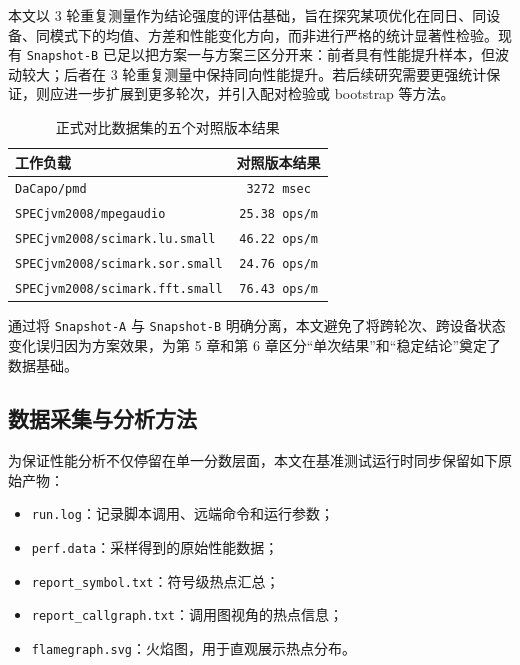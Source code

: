 本文以 3 轮重复测量作为结论强度的评估基础，旨在探究某项优化在同日、同设备、同模式下的均值、方差和性能变化方向，而非进行严格的统计显著性检验。现有 \texttt{Snapshot-B} 已足以把方案一与方案三区分开来：前者具有性能提升样本，但波动较大；后者在 3 轮重复测量中保持同向性能提升。若后续研究需要更强统计保证，则应进一步扩展到更多轮次，并引入配对检验或 bootstrap 等方法。

\begin{table}[htbp]
    \centering
    \small
    \caption{正式对比数据集的五个对照版本结果}
    \label{tab:formal-baseline-values}
    \begin{tabular}{lc}
        \hline
        \textbf{工作负载} & \textbf{对照版本结果} \\
        \hline
        \texttt{DaCapo/pmd} & \texttt{3272\,msec} \\
        \texttt{SPECjvm2008/mpegaudio} & \texttt{25.38\,ops/m} \\
        \texttt{SPECjvm2008/scimark.lu.small} & \texttt{46.22\,ops/m} \\
        \texttt{SPECjvm2008/scimark.sor.small} & \texttt{24.76\,ops/m} \\
        \texttt{SPECjvm2008/scimark.fft.small} & \texttt{76.43\,ops/m} \\
        \hline
    \end{tabular}
\end{table}

通过将 \texttt{Snapshot-A} 与 \texttt{Snapshot-B} 明确分离，本文避免了将跨轮次、跨设备状态变化误归因为方案效果，为第 5 章和第 6 章区分“单次结果”和“稳定结论”奠定了数据基础。

\subsection{数据采集与分析方法}

为保证性能分析不仅停留在单一分数层面，本文在基准测试运行时同步保留如下原始产物：
\begin{itemize}
    \item \texttt{run.log}：记录脚本调用、远端命令和运行参数；
    \item \texttt{perf.data}：采样得到的原始性能数据；
    \item \texttt{report\_symbol.txt}：符号级热点汇总；
    \item \texttt{report\_callgraph.txt}：调用图视角的热点信息；
    \item \texttt{flamegraph.svg}：火焰图，用于直观展示热点分布。
\end{itemize}

